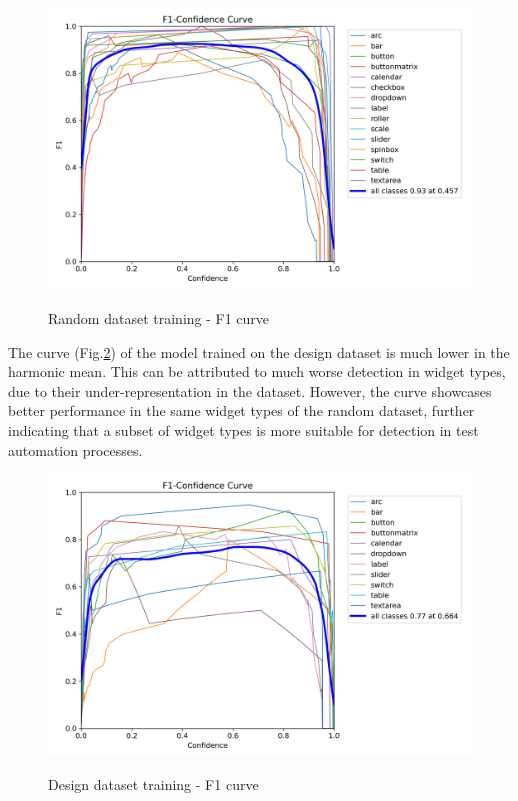 \documentclass[Bachelor, BIC, english, fhCitStyle, IEEE]{BASE/twbook} %
\begin{document}
\begin{figure}[H]
    \caption{Random dataset training - F1 curve}
    \centering
    \includegraphics[width=\textwidth]{PICs/train371/F1_curve.png}
    \label{fig:random-training-f1}
\end{figure}
\noindent
The curve (Fig.\ref{fig:design-training-f1}) of the model trained on the design dataset is much lower in the harmonic mean. This can be attributed to much worse detection in widget types, due to their under-representation in the dataset. However, the curve showcases better performance in the same widget types of the random dataset, further indicating that a subset of widget types is more suitable for detection in test automation processes.
\begin{figure}[H]
    \caption{Design dataset training - F1 curve}
    \centering
    \includegraphics[width=\textwidth]{PICs/train373/F1_curve.png}
    \label{fig:design-training-f1}
\end{figure}
\end{document}
